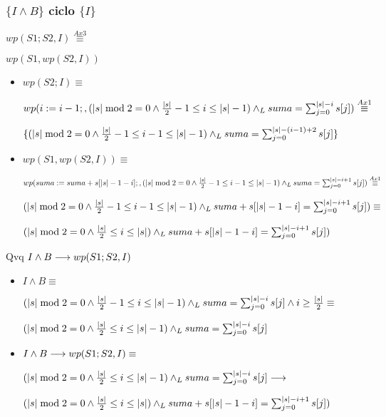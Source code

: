 \documentclass{article}
\begin{document}
\subsubsection*{$\{I \wedge B\}$ ciclo $\{ I \}$}

$wp(S1;S2, I) \stackrel{Ax3}{\equiv}$

$wp(S1, wp(S2, I))$

\begin{itemize}
    \item $wp(S2; I) \equiv$

    $wp(i:= i-1;, (|s| \bmod 2 = 0 \wedge \frac{|s|}{2} - 1 \leq i \leq |s| - 1) \land _L suma = \sum_{j=0}^{|s|-i} s[j]) \stackrel{Ax1}{\equiv}$

    $\{(|s| \bmod 2 = 0 \wedge \frac{|s|}{2} - 1 \leq i-1 \leq |s| - 1) \land _L suma = \sum_{j=0}^{|s|-(i-1)+2} s[j]\}$

    \item $wp(S1, wp(S2, I)) \equiv$

    $wp(suma := suma + s[|s|-1-i];, (|s| \bmod 2 = 0 \wedge \frac{|s|}{2} - 1 \leq i-1 \leq |s| - 1) \land _L suma = \sum_{j=0}^{|s|-i+1} s[j])\stackrel{Ax1}{\equiv}$

    $ (|s| \bmod 2 = 0 \wedge \frac{|s|}{2} - 1 \leq i-1 \leq |s| - 1) \land _L suma + s[|s|-1-i] = \sum_{j=0}^{|s|-i+1} s[j]) \equiv$

    $ (|s| \bmod 2 = 0 \wedge \frac{|s|}{2} \leq i \leq |s|) \land _L suma + s[|s|-1-i] = \sum_{j=0}^{|s|-i+1} s[j])$

\end{itemize}

Qvq $I \wedge B \longrightarrow wp(S1;S2, I)$

\begin{itemize}
    \item $I \wedge B \equiv$

    $ (|s| \bmod 2 = 0 \wedge \frac{|s|}{2} - 1 \leq i \leq |s| - 1) \land _L suma = \sum_{j=0}^{|s|-i} s[j] \wedge i \geq \frac{|s|}{2} \equiv$

    $ (|s| \bmod 2 = 0 \wedge \frac{|s|}{2} \leq i \leq |s| - 1) \land _L suma = \sum_{j=0}^{|s|-i} s[j] $

    \item $I \wedge B \longrightarrow wp(S1;S2, I) \equiv$

    $ (|s| \bmod 2 = 0 \wedge \frac{|s|}{2} \leq i \leq |s| - 1) \land _L suma = \sum_{j=0}^{|s|-i} s[j] \longrightarrow$

    $ (|s| \bmod 2 = 0 \wedge \frac{|s|}{2} \leq i \leq |s|) \land _L suma + s[|s|-1-i] = \sum_{j=0}^{|s|-i+1} s[j])$

\end{itemize}
\end{document}
